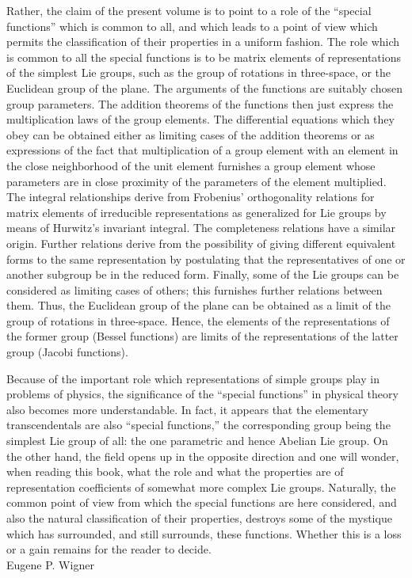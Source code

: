 Rather, the claim of the present volume is to point to a role of the ``special functions'' which is common to all, and which leads to a point of view which permits the classification of their properties in a uniform fashion. The role which is common to all the special functions is to be matrix elements of representations of the simplest Lie groups, such as the group of rotations in three-space, or the Euclidean group of the plane. The arguments of the functions are suitably chosen group parameters. The addition theorems of the functions then just express the multiplication laws of the group elements. The differential equations which they obey can be obtained either as limiting cases of the addition theorems or as expressions of the fact that multiplication of a group element with an element in the close neighborhood of the unit element furnishes a group element whose parameters are in close proximity of the parameters of the element multiplied. The integral relationships derive from Frobenius' orthogonality relations for matrix elements of irreducible representations as generalized for Lie groups by means of Hurwitz's invariant integral. The completeness relations have a similar origin. Further relations derive from the possibility of giving different equivalent forms to the same representation by postulating that the representatives of one or another subgroup be in the reduced form. Finally, some of the Lie groups can be considered as limiting cases of others; this furnishes further relations between them. Thus, the Euclidean group of the plane can be obtained as a limit of the group of rotations in three-space. Hence, the elements of the representations of the former group (Bessel functions) are limits of the representations of the latter group (Jacobi functions).

Because of the important role which representations of simple groups play in problems of physics, the significance of the ``special functions'' in physical theory also becomes more understandable. In fact, it appears that the elementary transcendentals are also ``special functions,'' the corresponding group being the simplest Lie group of all: the one parametric and hence Abelian Lie group. On the other hand, the field opens up in the opposite direction and one will wonder, when reading this book, what the role and what the properties are of representation coefficients of somewhat more complex Lie groups.
Naturally, the common point of view from which the special functions are here considered, and also the natural classification of their properties, destroys some of the mystique which has surrounded, and still surrounds, these functions. Whether this is a loss or a gain remains for the reader to decide.\\[10pt]

\qquad \qquad \qquad \qquad \qquad \qquad \qquad \qquad \qquad \qquad \qquad \qquad \qquad Eugene P. Wigner


\endinput